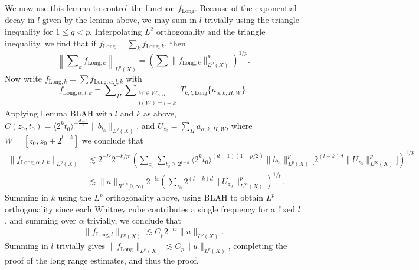 We now use this lemma to control the function $f_{\text{Long}}$. Because of the exponential decay in $l$ given by the lemma above, we may sum in $l$ trivially using the triangle inequality for $1 \leq q < p$. Interpolating $L^2$ orthogonality and the triangle inequality, we find that if $f_{\text{Long}} = \sum_k f_{\text{Long},k}$, then
%
\[ \left\| \sum\nolimits_k f_{\text{Long},k} \right\|_{L^p(X)} = \left( \sum \| f_{\text{Long},k} \|_{L^p(X)}^p \right)^{1/p}. \]
%
Now write $f_{\text{Long},k} = \sum f_{\text{Long},\alpha,l,k}$ with
%
\[ f_{\text{Long},\alpha,l,k} = \sum\nolimits_H \sum\nolimits_{\substack{W \in \mathcal{W}_{\alpha,H}\\l(W) = l - k}} T_{k,l,\text{Long}} \{ a_{\alpha,k,H,W} \}. \]
%
Applying Lemma BLAH with $l$ and $k$ as above, $C(z_0,t_0) = \langle 2^k t_0 \rangle^{- \frac{d-1}{2}} \| b_{t_0} \|_{L^q(X)}$, and $U_{z_0} = \sum\nolimits_H a_{\alpha,k,H,W}$, where $W = [z_0, z_0 + 2^{l-k}]$ we conclude that
%
\begin{align*}
    \| f_{\text{Long},\alpha,l,k} \|_{L^p(X)} &\lesssim 2^{-l \varepsilon} 2^{-k/p'} \left( \sum\nolimits_{z_0} \sum\nolimits_{t_0 \geq 2^{l-k}} \langle 2^k t_0 \rangle^{(d-1)(1 - p/2)} \| b_{t_0} \|_{L^p(X)}^p \big[ 2^{(l-k)d} \| U_{z_0} \|_{L^\infty(X)}^p \big] \right)^{1/p}\\
    &\lesssim \| a \|_{R^{s,p}[0,\infty)} 2^{-l \varepsilon} \left( \sum\nolimits_{z_0} 2^{(l-k)d} \| U_{z_0} \|_{L^\infty(X)}^p \right)^{1/p}.
\end{align*}
%
Summing in $k$ using the $L^p$ orthogonality above, using BLAH to obtain $L^p$ orthogonality since each Whitney cube contributes a single frequency for a fixed $l$, and summing over $\alpha$ trivially, we conclude that
%
\[ \| f_{\text{Long},l} \|_{L^p(X)} \lesssim C_p 2^{-l \varepsilon} \| u \|_{L^p(X)}. \]
%
Summing in $l$ trivially gives $\| f_{\text{Long}} \|_{L^p(X)} \lesssim C_p \| u \|_{L^p(X)}$, completing the proof of the long range estimates, and thus the proof.